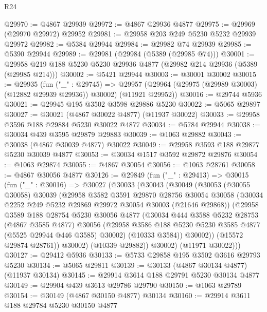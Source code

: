 \begin{lexlean}{R24}
\begin{coremodule}
@29970 := @4867 @29939
@29972 := @4867 @29936 @4877
@29975 := @29969 (@29970 @29972) @29952
@29981 := @29958 @203 @249 @5230 @5232 @29939 @29972
@29982 := @5384 @29944
@29984 := @29982 @74 @29939
@29985 := @5390 @29944
@29989 := @29981 (@29984 (@5389 (@29985 @74)))
@30001 := @29958 @219 @188 @5230 @5230 @29936 @4877 (@29982 @214 @29936 (@5389 (@29985 @214)))
@30002 := @5421 @29944
@30003 := @30001 @30002
@30015 := @29935
    (fun ("_" : @29745) =>
    @29957 (@29964 (@29975 (@29989 @30003) (@12882 @29939 @29936)) @30002) (@11921 @29952))
@30016 := @29744 @5936
@30021 := @29945 @195 @3502 @3598 @29886 @5230
@30022 := @5065 @29897
@30027 := @30021 (@4867 @30022 @4877) (@11937 @30022)
@30033 := @29958 @3596 @188 @29884 @5230 @30022 @4877
@30034 := @5784 @29944
@30038 := @30034 @439 @3595 @29879 @29883
@30039 := @1063 @29882
@30043 := @30038 (@4867 @30039 @4877) @30022
@30049 := @29958 @3593 @188 @29877 @5230 @30039 @4877
@30053 := @30034 @1517 @3592 @29872 @29876
@30054 := @1063 @29874
@30055 := @4867 @30054
@30056 := @1063 @28761
@30058 := @4867 @30056 @4877
@30126 := @29849
    (fun ("_" : @29413) =>
    @30015
      (fun ("_" : @30016) =>
      @30027
        (@30033
          (@30043
            (@30049
              (@30053
                (@30055 @30058)
                @30039
                (@29958
                  @3582
                  @3591
                  @29870
                  @28756
                  @30054
                  @30058
                  (@30034 @2252 @249 @5232 @29869 @29972 @30054 @30003 (@21646 @29868))
                  (@29958
                    @3589
                    @188
                    @28754
                    @5230
                    @30056
                    @4877
                    (@30034
                      @444
                      @3588
                      @5232
                      @28753
                      (@4867 @3585 @4877)
                      @30056
                      (@29958 @3586 @188 @5230 @5230 @3585 @4877 (@5525 @29944 @446 @3585) @30002)
                      (@10333 @3584))
                    @30002))
                (@15572 @29874 @28761))
              @30002)
            (@10339 @29882))
          @30002)
        (@11971 @30022)))
@30127 := @29412 @5936
@30133 := @5733 @29858 @195 @3502 @3616 @29793 @5230
@30134 := @5065 @29811
@30139 := @30133 (@4867 @30134 @4877) (@11937 @30134)
@30145 := @29914 @3614 @188 @29791 @5230 @30134 @4877
@30149 := @29904 @439 @3613 @29786 @29790
@30150 := @1063 @29789
@30154 := @30149 (@4867 @30150 @4877) @30134
@30160 := @29914 @3611 @188 @29784 @5230 @30150 @4877

\end{coremodule}
\end{lexlean}
